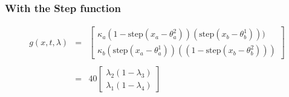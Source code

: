 \documentclass{article}
\begin{document}
\subsubsection*{With the Step function}
\begin{equation}
  \label{eq:g1step}
  \begin{array}{lcl}
  g(x,t,\lambda) &=&  \left[
    \begin{array}{l}
      \kappa_a      (1- \mbox{step}( x_a - \theta_a^2))( \mbox{step}( x_b - \theta_b^1)))\\
      \kappa_b      (\mbox{step}( x_a - \theta_a^1))((1- \mbox{step}( x_b - \theta_b^2)))
    \end{array}
  \right]\\ \\
  &=& 40   \left[
    \begin{array}{l}
          \lambda_2 (1-\lambda_3)\\
          \lambda_1 (1-\lambda_4)
    \end{array}
  \right] 
\end{array}
\end{equation}
\end{document}
